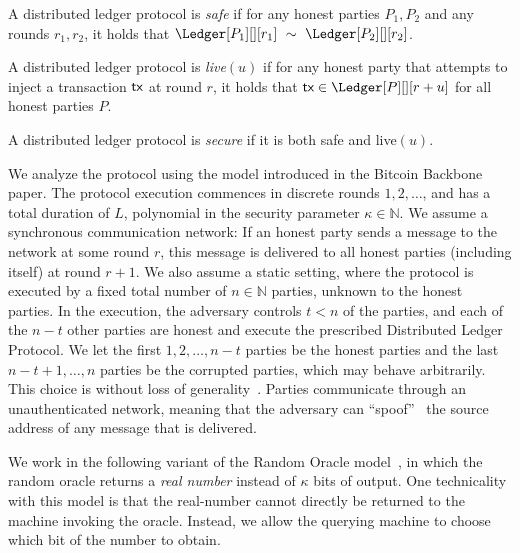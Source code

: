 \begin{definition}[Safety]
  A distributed ledger protocol is \emph{safe} if
  for any honest parties $P_1, P_2$ and any rounds $r_1, r_2$, it holds that
  $\Ledger[P_1][][r_1]~\sim~\Ledger[P_2][][r_2]$.
\end{definition}

\begin{definition}[Liveness]
  A distributed ledger protocol is \emph{live}$(u)$ if
  for any honest party that attempts to inject a transaction $\textsf{tx}$
  at round $r$, it holds that $\tx \in \Ledger[P][][r+u]$
  for all honest parties $P$.
\end{definition}

\begin{definition}[Secure]
  A distributed ledger protocol is \emph{secure} if it is
  both safe and live$(u)$.
\end{definition}

We analyze the protocol using the model introduced in the Bitcoin Backbone~\cite{backbone} paper.
The protocol execution commences in discrete rounds $1, 2, \ldots$, and has a total duration of
$L$, polynomial in the security parameter $\kappa \in \mathbb{N}$.
We assume a synchronous communication network: If an honest party sends a message
to the network at some round $r$, this message is delivered to all honest parties
(including itself) at round $r + 1$.
We also assume a static setting, where the protocol is executed by
a fixed total number of $n \in \mathbb{N}$ parties, unknown to the honest parties.
In the execution, the adversary controls $t < n$ of the parties,
and each of the $n - t$ other parties are honest and execute the prescribed Distributed Ledger
Protocol. We let the first $1, 2, \ldots, n - t$ parties be the honest parties
and the last $n - t + 1, \ldots, n$ parties be the corrupted parties, which may behave arbitrarily.
This choice is without loss of generality~\cite[Proposition 18]{backbone}.
Parties communicate through an unauthenticated network,
meaning that the adversary can ``spoof''~\cite{douceur2002sybil}
the source address of any message that is delivered.

We work in the following variant of the Random Oracle model~\cite{ro}, in which
the random oracle returns a \emph{real number} instead of $\kappa$ bits of output.
One technicality with this model is that the real-number cannot directly be returned
to the machine invoking the oracle. Instead, we allow the querying machine to choose which
bit of the number to obtain.

